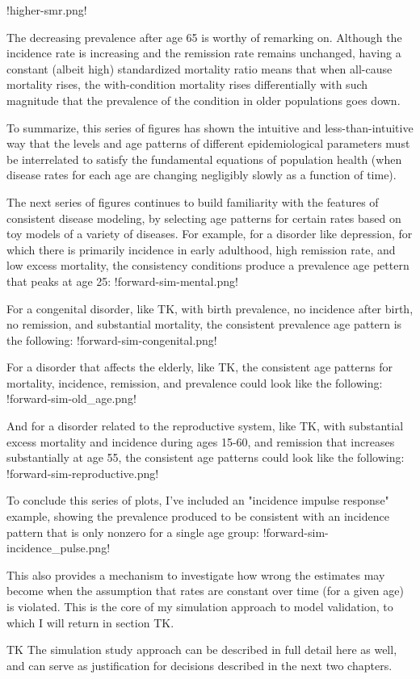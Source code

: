 !higher-smr.png!

The decreasing prevalence after age 65 is worthy of remarking on. Although the incidence rate is increasing and the remission rate remains unchanged, having a constant (albeit high) standardized mortality ratio means that when all-cause mortality rises, the with-condition mortality rises differentially with such magnitude that the prevalence of the condition in older populations goes down.

To summarize, this series of figures has shown the intuitive and less-than-intuitive way that the levels and age patterns of different epidemiological parameters must be interrelated to satisfy the fundamental equations of population health (when disease rates for each age are changing negligibly slowly as a function of time).

The next series of figures continues to build familiarity with the features of consistent disease modeling, by selecting age patterns for certain rates based on toy models of a variety of diseases.  For example, for a disorder like depression, for which there is primarily incidence in early adulthood, high remission rate, and low excess mortality, the consistency conditions produce a prevalence age pettern that peaks at age 25:
!forward-sim-mental.png!

For a congenital disorder, like TK, with birth prevalence, no incidence after birth, no remission, and substantial mortality, the consistent prevalence age pattern is the following:
!forward-sim-congenital.png!

For a disorder that affects the elderly, like TK, the consistent age patterns for mortality, incidence, remission, and prevalence could look like the following:
!forward-sim-old_age.png!

And for a disorder related to the reproductive system, like TK, with substantial excess mortality and incidence during ages 15-60, and remission that increases substantially at age 55, the consistent age patterns could look like the following:
!forward-sim-reproductive.png!

To conclude this series of plots, I've included an "incidence impulse response" example, showing the prevalence produced to be consistent with an incidence pattern that is only nonzero for a single age group:
!forward-sim-incidence_pulse.png!

This also provides a mechanism to investigate how wrong the estimates may become when the assumption that rates are constant over time (for a given age) is violated. This is the core of my simulation approach to model validation, to which I will return in section TK.

TK The simulation study approach can be described in full detail here as well, and can serve as justification for decisions described in the next two chapters.

